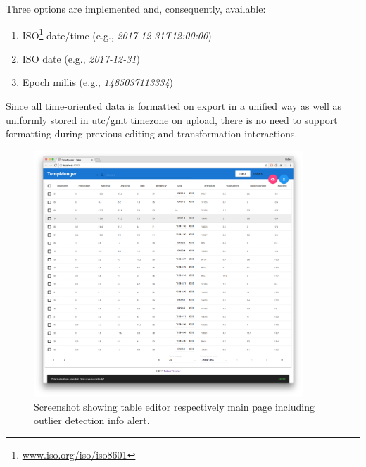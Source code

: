 Three options are implemented and, consequently, available:

\begin{enumerate}
  \item \textsc{ISO}\footnote{\textcolor{blue}{\href{http://www.iso.org/iso/iso8601}{www.iso.org/iso/iso8601}}} date/time (e.g., \emph{2017-12-31T12:00:00})
  \item \textsc{ISO} date (e.g., \emph{2017-12-31})
  \item Epoch millis (e.g., \emph{1485037113334})
\end{enumerate}

Since all time-oriented data is formatted on export in a unified way as well as uniformly stored in \gls{utc}/\gls{gmt} timezone on upload, there is no need to support formatting during previous editing and transformation interactions.

\begin{figure}
  \centering
  \includegraphics[width=0.9\textwidth]{figures/implementation/screenshot-table-editor}
  \caption{Screenshot showing table editor respectively main page including outlier detection info alert.}
  \label{fig:screenshot-table-editor}
\end{figure}

